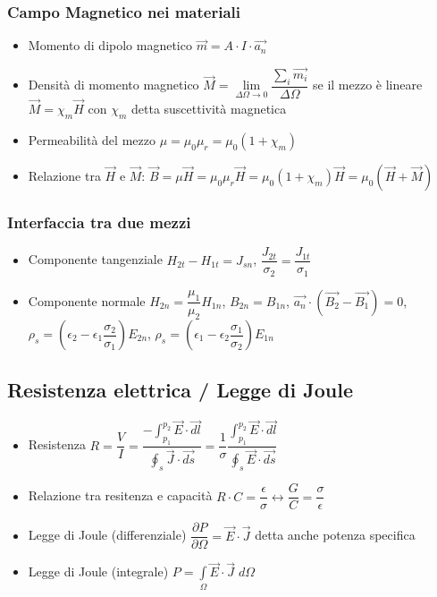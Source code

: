 \documentclass{article}
\begin{document}
\subsubsection{Campo Magnetico nei materiali}
\begin{itemize}
	\item Momento di dipolo magnetico \( \vec{m} = A \cdot I \cdot \vec{a_n} \)
	\item Densità di momento magnetico \(\vec{M} = \lim\limits_{\Delta\Omega \rightarrow 0} \dfrac{\sum_i \vec{m_i}}{\Delta\Omega}\) se il mezzo è lineare \( \vec{M} = \chi_m \vec{H} \) con \(\chi_m\) detta suscettività magnetica
	\item Permeabilità del mezzo \( \mu = \mu_0 \mu_r = \mu_0 (1 + \chi_m) \)
	\item Relazione tra \( \vec{H} \) e \( \vec{M} \): \( \vec{B} = \mu \vec{H} = \mu_0 \mu_r \vec{H} = \mu_0 (1 + \chi_m) \vec{H} = \mu_0 (\vec{H} + \vec{M}) \)
\end{itemize}



\subsubsection{Interfaccia tra due mezzi}
\begin{itemize}
	\item Componente tangenziale \( H_{2t} - H_{1t} = J_{sn} \), \( \dfrac{J_{2t}}{\sigma_2} = \dfrac{J_{1t}}{\sigma_1} \)
	\item Componente normale \( H_{2n} = \dfrac{\mu_1}{\mu_2} H_{1n} \), \(B_{2n} = B_{1n}\), \( \vec{a_n} \cdot (\vec{B_2} - \vec{B_1}) = 0 \), \( \rho_s = ( \epsilon_2 - \epsilon_1 \dfrac{\sigma_2}{\sigma_1}) E_{2n} \),  \( \rho_s = ( \epsilon_1 - \epsilon_2 \dfrac{\sigma_1}{\sigma_2}) E_{1n} \)
\end{itemize}

\subsection{Resistenza elettrica / Legge di Joule}
\begin{itemize}
	\item Resistenza \(\displaystyle  R = \dfrac{V}{I} = \dfrac{-\int_{p_1}^{p_2} \vec{E} \cdot \vec{dl}}{\oint_s \vec{J} \cdot \vec{ds}} = \dfrac{1}{\sigma} \dfrac{\int_{p_1}^{p_2} \vec{E} \cdot \vec{dl}}{\oint_s \vec{E} \cdot \vec{ds}} \)
	\item Relazione tra resitenza e capacità \(R \cdot C = \dfrac{\epsilon}{\sigma} \leftrightarrow \dfrac{G}{C} = \dfrac{\sigma}{\epsilon} \)
	\item Legge di Joule (differenziale) \( \dfrac{\partial P}{\partial \Omega} = \vec{E} \cdot \vec{J} \) detta anche potenza specifica
	\item Legge di Joule (integrale) \(\displaystyle P = \int\limits_\Omega \vec{E} \cdot \vec{J} \; d\Omega \)
\end{itemize}
\end{document}
